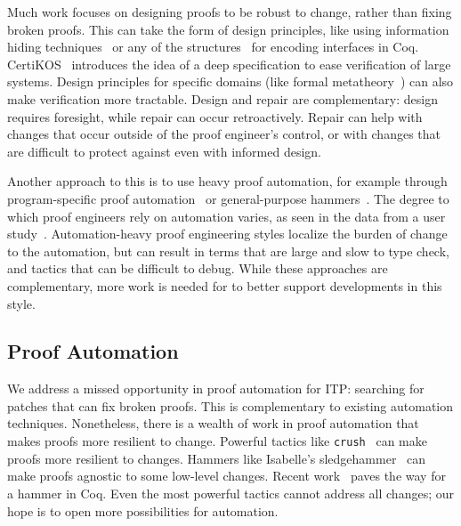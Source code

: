 Much work focuses on designing proofs
to be robust to change, rather than fixing broken proofs.
This can take the form of design principles, like using 
information hiding techniques~\cite{Woos:2016:PCF:2854065.2854081, Klein:2014:CFV:2584468.2560537}
or any of the structures~\cite{Chrzaszcz2003, Sozeau2008, Saibi:PhD} for encoding interfaces in Coq.
CertiKOS~\cite{certikos} introduces the idea of a deep specification to ease verification of large systems.
Design principles for specific domains (like formal metatheory~\cite{Aydemir2008, Delaware2013POPL, Delaware2013ICFP})
can also make verification more tractable.
Design and repair are complementary: design requires foresight, while repair can occur retroactively.
Repair can help with changes that occur outside of the proof engineer's control,
or with changes that are difficult to protect against even with informed design.

Another approach to this is to use heavy proof automation, for example through
program-specific proof automation~\cite{Chlipala:2013:CPD:2584504}
or general-purpose hammers~\cite{Blanchette2016b, Blanchette2013, Kaliszyk2014, Czajka2018}.
The degree to which proof engineers rely on automation varies, as seen in the data from a user study~\cite{replica}.
Automation-heavy proof engineering styles localize the burden of change to the automation,
but can result in terms that are large and slow to type check,
and tactics that can be difficult to debug.
While these approaches are complementary, more work is needed for \toolname to better support 
developments in this style.

\subsection*{Proof Automation}


We address a missed opportunity in proof automation for ITP: searching
for patches that can fix broken proofs.
This is complementary to existing automation techniques. Nonetheless, there is a wealth
of work in proof automation that makes proofs more resilient to change.
Powerful tactics like \lstinline{crush}~\cite{chlipala:cpdt} can make
proofs more resilient to changes. 
Hammers like Isabelle's sledgehammer~\cite{Blanchette2013} can make proofs agnostic to some low-level changes.
Recent work~\cite{coqhammer} paves the way for a hammer in Coq.
Even the most powerful tactics cannot address all changes;
our hope is to open more possibilities for automation.

